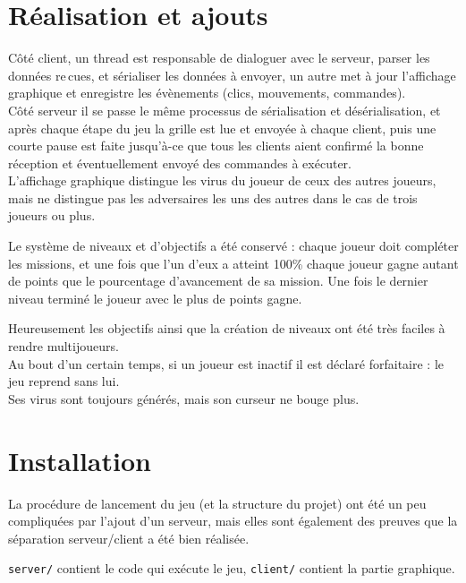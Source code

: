 \documentclass[a4paper,french]{article}
\newcommand{\ttt}[1]{\texttt{#1}}
\begin{document}
\section{R\'ealisation et ajouts}

C\^ot\'e client, un thread est responsable de dialoguer avec le serveur, parser les donn\'ees re\,cues, et
s\'erialiser les donn\'ees \`a envoyer, un autre met \`a jour l'affichage graphique et enregistre les
\'ev\`enements (clics, mouvements, commandes).\\

C\^ot\'e serveur il se passe le m\^eme processus de s\'erialisation et d\'es\'erialisation, et apr\`es chaque
\'etape du jeu la grille est lue et envoy\'ee \`a chaque client, puis une courte pause est faite jusqu'\`a-ce que
tous les clients aient confirm\'e la bonne r\'eception et \'eventuellement envoy\'e des commandes \`a ex\'ecuter.\\

L'affichage graphique distingue les virus du joueur de ceux des autres joueurs, mais ne distingue pas les 
adversaires les uns des autres dans le cas de trois joueurs ou plus.

Le syst\`eme de niveaux et d'objectifs a \'et\'e conserv\'e : chaque joueur doit compl\'eter les missions,
et une fois que l'un d'eux a atteint 100\% chaque joueur gagne autant de points que le pourcentage d'avancement
de sa mission. Une fois le dernier niveau termin\'e le joueur avec le plus de points gagne.

Heureusement les objectifs ainsi que la cr\'eation de niveaux ont \'et\'e tr\`es faciles \`a rendre multijoueurs.\\

Au bout d'un certain temps, si un joueur est inactif il est d\'eclar\'e forfaitaire : le jeu reprend sans lui.\\
Ses virus sont toujours g\'en\'er\'es, mais son curseur ne bouge plus.\\


\section{Installation}

La proc\'edure de lancement du jeu (et la structure du projet) ont \'et\'e un peu compliqu\'ees par l'ajout d'un serveur,
mais elles sont \'egalement des preuves que la s\'eparation serveur/client a \'et\'e bien r\'ealis\'ee.

\ttt{server/} contient le code qui ex\'ecute le jeu, \ttt{client/} contient la partie graphique.\\
\end{document}
